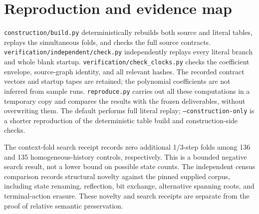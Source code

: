 \documentclass[11pt]{article}
\begin{document}
\section{Reproduction and evidence map}
\texttt{construction/build.py} deterministically rebuilds both source
and literal tables, replays the simultaneous folds, and checks the full
source contracts. \texttt{verification/independent/check.py} independently
replays every literal branch and whole blank startup.
\texttt{verification/check\_clocks.py} checks the coefficient envelope,
source-graph identity, and all relevant hashes. The recorded contract
vectors and startup tapes are retained; the polynomial coefficients are
not inferred from sample runs. \texttt{reproduce.py} carries out all
these computations in a temporary copy and compares the results with
the frozen deliverables, without overwriting them. The default performs
full literal replay; \texttt{--construction-only} is a shorter reproduction
of the deterministic table build and construction-side checks.

The context-fold search receipt records zero additional 1/3-step folds
among 136 and 135 homogeneous-history controls, respectively. This is
a bounded negative search result, not a lower bound on possible state
counts. The independent census comparison records structural novelty
against the pinned supplied corpus, including state renaming, reflection,
bit exchange, alternative spanning roots, and terminal-action erasure.
These novelty and search receipts are separate from the proof of
relative semantic preservation.
\end{document}
